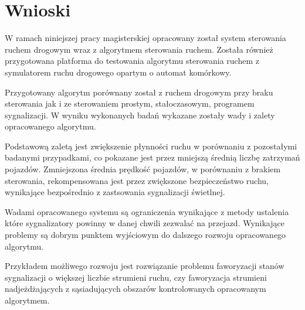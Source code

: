 \chapter{Wnioski}
W ramach niniejszej pracy magisterskiej opracowany został system sterowania ruchem drogowym wraz z algorytmem sterowania ruchem. Została również przygotowana platforma do testowania algorytmu sterowania ruchem z symulatorem ruchu drogowego opartym o automat komórkowy.

Przygotowany algorytm porównany został z ruchem drogowym przy braku sterowania jak i ze sterowaniem prostym, stałoczasowym, programem sygnalizacji. W wyniku wykonanych badań wykazane zostały wady i zalety opracowanego algorytmu.

Podstawową zaletą jest zwiększenie płynności ruchu w porównaniu z pozostałymi badanymi przypadkami, co pokazane jest przez mniejszą średnią liczbę zatrzymań pojazdów. Zmniejszona średnia prędkość pojazdów, w porównaniu z brakiem sterowania, rekompensowana jest przez zwiększone bezpieczeństwo ruchu, wynikające bezpośrednio z zastsowania sygnalizacji świetlnej.

Wadami opracowanego systemu są ograniczenia wynikające z metody ustalenia które sygnalizatory powinny w danej chwili zezwalać na przejazd. Wynikające problemy są dobrym punktem wyjściowym do dalszego rozwoju opracowanego algorytmu.

Przykładem możliwego rozwoju jest rozwiązanie problemu faworyzacji stanów sygnalizacji o większej liczbie strumieni ruchu, czy faworyzacja strumieni nadjeżdżających z sąsiadujących obszarów kontrolowanych opracowanym algorytmem.